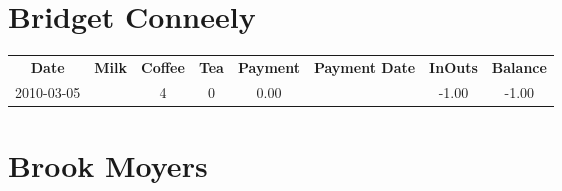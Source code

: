 \section{Bridget Conneely}

\begin{center}
\begin{tabular}{cccccccc}
\textbf{Date} & \textbf{Milk} & \textbf{Coffee} & \textbf{Tea} & \textbf{Payment} & \textbf{Payment Date} & \textbf{InOuts} & \textbf{Balance} \\
2010-03-05 &  & 4 & 0 & 0.00 &  & -1.00 & -1.00
\end{tabular}
\end{center}

\section{Brook Moyers}

